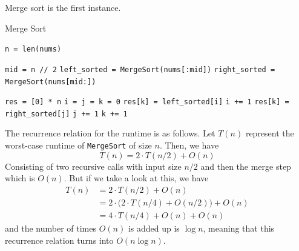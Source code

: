   \begin{algo}
    Merge sort is the first instance. 
    \begin{algorithm}[H]
      \caption{Merge Sort}
      \label{alg:merge_sort}
      \begin{algorithmic}
          \State \texttt{n = len(nums)}

           
            \State {}
          \EndIf
          \State \texttt{mid = n // 2} 
          \State \texttt{left\_sorted = MergeSort(nums[:mid])} 
          \State \texttt{right\_sorted = MergeSort(nums[mid:])} 

          \State \texttt{res = [0] * n} 
          \State \texttt{i = j = k = 0} 
           
              \State \texttt{res[k] = left\_sorted[i]} 
              \State \texttt{i += 1} 
            \Else 
              \State \texttt{res[k] = right\_sorted[j]}
              \State \texttt{j += 1}
            \EndIf 
            \State \texttt{k += 1}
          \EndWhile

          \State {}
        \EndFunction
      \end{algorithmic}
    \end{algorithm}
    The recurrence relation for the runtime is as follows. Let $T(n)$ represent the worst-case runtime of \texttt{MergeSort} of size $n$. Then, we have 
    \begin{equation}
      T(n) = 2 \cdot T(n/2) + O(n)
    \end{equation}
    Consisting of two recursive calls with input size $n/2$ and then the merge step which is $O(n)$. But if we take a look at this, we have 
    \begin{align}
      T(n) & = 2 \cdot T(n/2) + O(n) \\
           & = 2 \cdot \big( 2 \cdot T(n/4) + O(n/2)) + O(n) \\
           & = 4 \cdot T(n/4) + O(n) + O(n) 
    \end{align}
    and the number of times $O(n)$ is added up is $\log{n}$, meaning that this recurrence relation turns into $O(n \log{n})$. 
  \end{algo}

